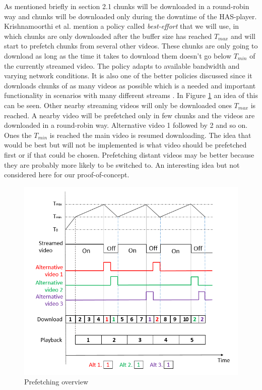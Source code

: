 \documentclass[9pt,a4paper]{acmproc}
\begin{document}
As mentioned briefly in section 2.1 chunks will be downloaded in a round-robin way and chunks will be downloaded only during the downtime of the HAS-player. Krishnamoorthi et al. \cite{bandawarePrefetch} mention a policy called \textit{best-effort} that we will use, in which chunks are only downloaded after the buffer size has reached $T_{max}$ and will start to prefetch chunks from several other videos. These chunks are only going to download as long as the time it takes to download them doesn't go below $T_{min}$ of the currently streamed video. The policy adapts to available bandwidth and varying network conditions. It is also one of the better policies discussed since it downloads chunks of as many videos as possible which is a needed and important functionality in  scenarios with many different streams \cite{bandawarePrefetch}. In Figure \ref{fig:prefetch} an idea of this can be seen. Other nearby streaming videos will only be downloaded ones $T_{max}$ is reached. A nearby video will be prefetched only in few chunks and the videos are downloaded in a round-robin way. Alternative video 1 followed by 2 and so on. Ones the $T_{min}$ is reached the main video is resumed downloading. The idea that would be best but will not be implemented is what video should be prefetched first or if that could be chosen. Prefetching distant videos may be better because they are probably more likely to be switched to. An interesting idea but not considered here for our proof-of-concept.

\begin{figure}[t!]
\begin{center}
	\includegraphics[scale=0.5]{prefetch.png}
	\caption{Prefetching overview}
	\label{fig:prefetch}
\end{center}
\end{figure}
\end{document}
